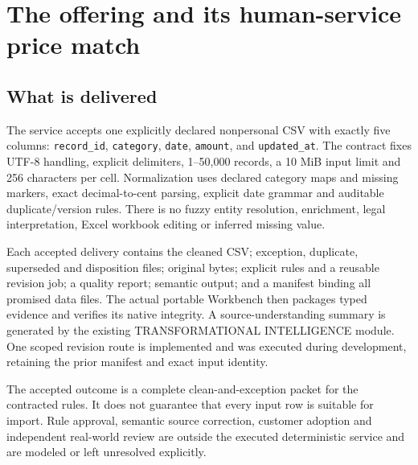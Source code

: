 \documentclass[11pt,letterpaper]{article}
\newcommand{\code}[1]{\texttt{\small #1}}
\begin{document}
\section{The offering and its human-service price match}
\subsection{What is delivered}
The service accepts one explicitly declared nonpersonal CSV with exactly five columns: \code{record\_id}, \code{category}, \code{date}, \code{amount}, and \code{updated\_at}. The contract fixes UTF-8 handling, explicit delimiters, 1--50,000 records, a 10 MiB input limit and 256 characters per cell. Normalization uses declared category maps and missing markers, exact decimal-to-cent parsing, explicit date grammar and auditable duplicate/version rules. There is no fuzzy entity resolution, enrichment, legal interpretation, Excel workbook editing or inferred missing value.

Each accepted delivery contains the cleaned CSV; exception, duplicate, superseded and disposition files; original bytes; explicit rules and a reusable revision job; a quality report; semantic output; and a manifest binding all promised data files. The actual portable Workbench then packages typed evidence and verifies its native integrity. A source-understanding summary is generated by the existing TRANSFORMATIONAL INTELLIGENCE module. One scoped revision route is implemented and was executed during development, retaining the prior manifest and exact input identity.

The accepted outcome is a complete clean-and-exception packet for the contracted rules. It does not guarantee that every input row is suitable for import. Rule approval, semantic source correction, customer adoption and independent real-world review are outside the executed deterministic service and are modeled or left unresolved explicitly.
\end{document}
